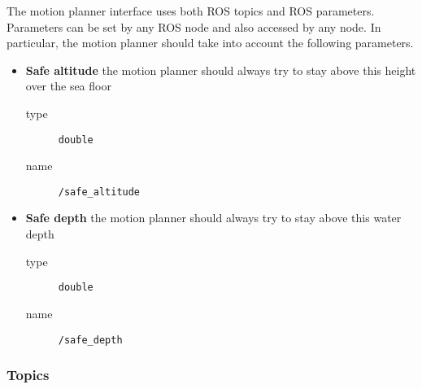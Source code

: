 \documentclass[9pt,technote]{IEEEtran} %
\begin{document}
The motion planner interface uses both ROS topics and ROS parameters.
Parameters can be set by any ROS node and also accessed by any node.
In particular, the motion planner should take into account the following parameters.
\begin{itemize}
\item \textbf{Safe altitude} the motion planner should always try to stay above this height over the sea floor \begin{description}
\item[type] \texttt{double}
\item[name] \texttt{/safe\_altitude}
\end{description}
\item \textbf{Safe depth} the motion planner should always try to stay above this water depth \begin{description}
\item[type] \texttt{double}
\item[name] \texttt{/safe\_depth}
\end{description}  
\end{itemize}

\subsubsection{Topics}

\end{document}
